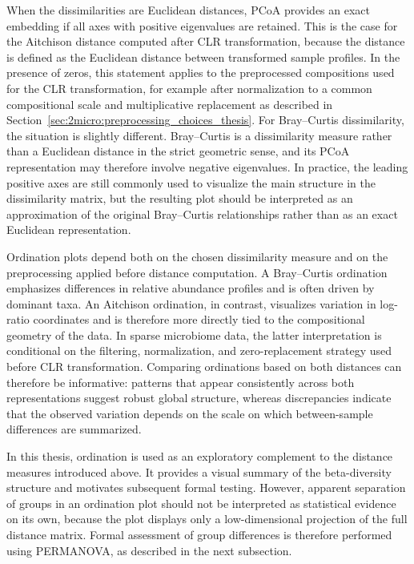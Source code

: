 When the dissimilarities are Euclidean distances, PCoA provides an exact embedding if all axes with positive eigenvalues are retained. This is the case for the Aitchison distance computed after CLR transformation, because the distance is defined as the Euclidean distance between transformed sample profiles. In the presence of zeros, this statement applies to the preprocessed compositions used for the CLR transformation, for example after normalization to a common compositional scale and multiplicative replacement as described in Section~\ref{sec:2micro:preprocessing_choices_thesis}. For Bray--Curtis dissimilarity, the situation is slightly different. Bray--Curtis is a dissimilarity measure rather than a Euclidean distance in the strict geometric sense, and its PCoA representation may therefore involve negative eigenvalues. In practice, the leading positive axes are still commonly used to visualize the main structure in the dissimilarity matrix, but the resulting plot should be interpreted as an approximation of the original Bray--Curtis relationships rather than as an exact Euclidean representation.

Ordination plots depend both on the chosen dissimilarity measure and on the preprocessing applied before distance computation. A Bray--Curtis ordination emphasizes differences in relative abundance profiles and is often driven by dominant taxa. An Aitchison ordination, in contrast, visualizes variation in log-ratio coordinates and is therefore more directly tied to the compositional geometry of the data. In sparse microbiome data, the latter interpretation is conditional on the filtering, normalization, and zero-replacement strategy used before CLR transformation. Comparing ordinations based on both distances can therefore be informative: patterns that appear consistently across both representations suggest robust global structure, whereas discrepancies indicate that the observed variation depends on the scale on which between-sample differences are summarized.

In this thesis, ordination is used as an exploratory complement to the distance measures introduced above. It provides a visual summary of the beta-diversity structure and motivates subsequent formal testing. However, apparent separation of groups in an ordination plot should not be interpreted as statistical evidence on its own, because the plot displays only a low-dimensional projection of the full distance matrix. Formal assessment of group differences is therefore performed using PERMANOVA, as described in the next subsection.

